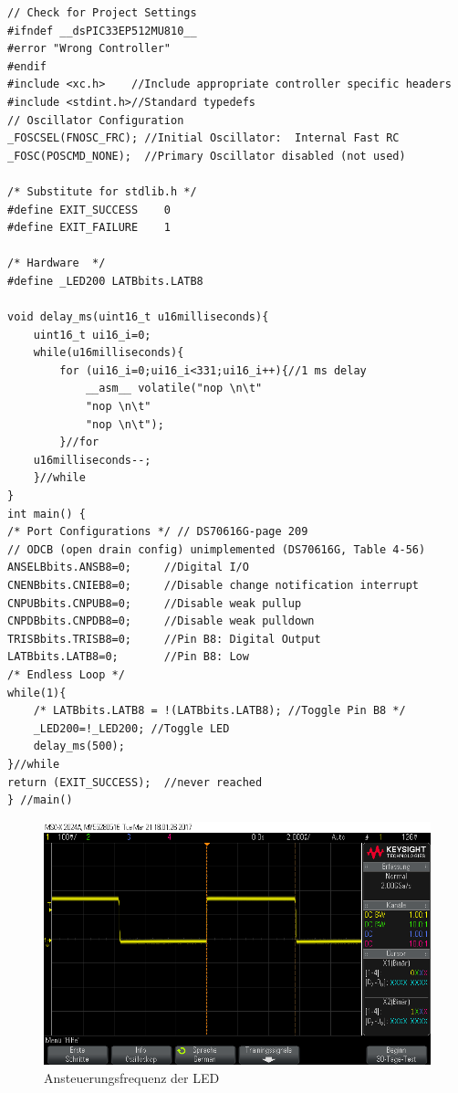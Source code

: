 \newpage
\begin{lstlisting}[frame=htrbl, caption={Quellcode HelloWorld2}, label={lst:HelloWorld2}]
// Check for Project Settings
#ifndef __dsPIC33EP512MU810__
#error "Wrong Controller"
#endif
#include <xc.h>    //Include appropriate controller specific headers
#include <stdint.h>//Standard typedefs
// Oscillator Configuration
_FOSCSEL(FNOSC_FRC); //Initial Oscillator:  Internal Fast RC
_FOSC(POSCMD_NONE);  //Primary Oscillator disabled (not used)

/* Substitute for stdlib.h */
#define	EXIT_SUCCESS	0
#define	EXIT_FAILURE	1

/* Hardware  */
#define _LED200 LATBbits.LATB8

void delay_ms(uint16_t u16milliseconds){
	uint16_t ui16_i=0;
	while(u16milliseconds){
		for (ui16_i=0;ui16_i<331;ui16_i++){//1 ms delay
			__asm__ volatile("nop \n\t"
			"nop \n\t"
			"nop \n\t");
		}//for
	u16milliseconds--;
	}//while
}
int main() {
/* Port Configurations */ // DS70616G-page 209
// ODCB (open drain config) unimplemented (DS70616G, Table 4-56)
ANSELBbits.ANSB8=0;     //Digital I/O
CNENBbits.CNIEB8=0;     //Disable change notification interrupt
CNPUBbits.CNPUB8=0;     //Disable weak pullup
CNPDBbits.CNPDB8=0;     //Disable weak pulldown
TRISBbits.TRISB8=0;     //Pin B8: Digital Output
LATBbits.LATB8=0;       //Pin B8: Low
/* Endless Loop */
while(1){
	/* LATBbits.LATB8 = !(LATBbits.LATB8); //Toggle Pin B8 */
	_LED200=!_LED200; //Toggle LED
	delay_ms(500);
}//while
return (EXIT_SUCCESS);  //never reached
} //main()
\end{lstlisting}
\newpage
\begin{figure}
	\centering
	\includegraphics[width=\textwidth]{Images/1_1_MIPS}
	\caption[AnsteuerungsfrequenzLED]{Ansteuerungsfrequenz der LED}
	\label{image:AnsteuerungsfrequenzLED}
\end{figure}


